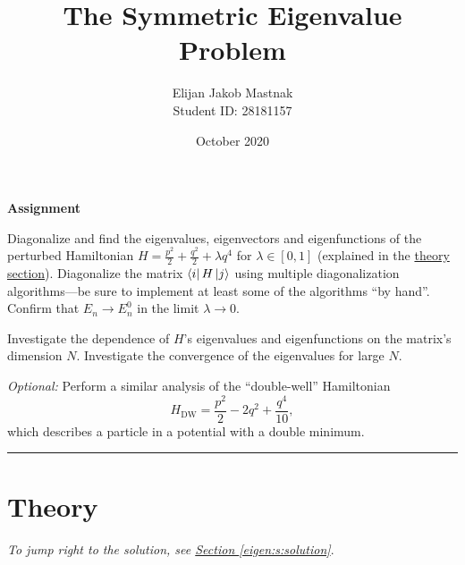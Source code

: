 \documentclass[11pt, a4paper]{article}
\begin{document}
\title{The Symmetric Eigenvalue Problem}
\author{Elijan Jakob Mastnak\\[1mm]\small{Student ID: 28181157}}
\date{October 2020}
\maketitle

\tableofcontents

\newpage
\begin{center}
\textbf{Assignment}
\end{center}
Diagonalize and find the eigenvalues, eigenvectors and eigenfunctions of the perturbed Hamiltonian $ H = \frac{p^{2}}{2} + \frac{q^{2}}{2} + \lambda q^{4}$ for $ \lambda \in [0, 1]$ (explained in the \hyperref[eigen:s:solution]{theory section}). Diagonalize the matrix $ \bra{i}H\ket{j} $ using multiple diagonalization algorithms---be sure to implement at least some of the algorithms ``by hand''. Confirm that $ E_{n} \to E_{n}^{0} $ in the limit $ \lambda \to 0 $. 

Investigate the dependence of $ H $'s eigenvalues and eigenfunctions on the matrix's dimension $ N $. Investigate the convergence of the eigenvalues for large $ N $. 

\vspace{2mm}
\textit{Optional:} Perform a similar analysis of the ``double-well'' Hamiltonian
\begin{equation*}
	H_{\text{DW}} = \frac{p^{2}}{2} - 2q^{2} + \frac{q^{4}}{10},
\end{equation*}
which describes a particle in a potential with a double minimum. 


\vspace{2mm}

\rule{\textwidth}{0.2pt}


\section{Theory} \label{eigen:s:theory}
\vspace{-2mm}
\textit{To jump right to the solution, see \hyperref[eigen:s:solution]{Section \ref{eigen:s:solution}}}.
\end{document}
